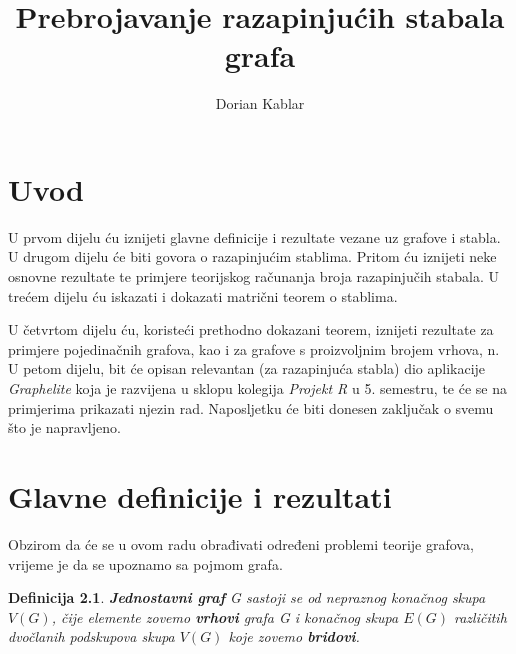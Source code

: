 \documentclass[times, utf8, zavrsni]{fer}
\newtheorem{definition}{Definicija}[section]
\begin{document}

\title{Prebrojavanje razapinjućih stabala grafa}

\author{Dorian Kablar}

\maketitle



\tableofcontents

\chapter{Uvod}
U prvom dijelu ću iznijeti glavne definicije i rezultate vezane uz grafove i stabla. U drugom dijelu će biti govora o razapinjućim stablima. Pritom ću iznijeti neke osnovne rezultate te primjere teorijskog računanja broja razapinjučih stabala. 
U trećem dijelu ću iskazati i dokazati matrični teorem o stablima. 

U četvrtom dijelu ću, koristeći prethodno dokazani teorem, iznijeti rezultate za primjere pojedinačnih grafova, kao i za grafove s proizvoljnim brojem vrhova, n. U petom dijelu, bit će opisan relevantan (za razapinjuća stabla) dio aplikacije \textit{Graphelite} koja je razvijena u sklopu kolegija \textit{Projekt R} u 5. semestru, te će se na primjerima prikazati njezin rad. Naposljetku će biti donesen zaključak o svemu što je napravljeno.

\chapter{Glavne definicije i rezultati}

Obzirom da će se u ovom radu obrađivati određeni problemi teorije grafova, vrijeme je da se upoznamo sa pojmom grafa.

\begin{definition}
	\textbf{Jednostavni graf} G sastoji se od nepraznog konačnog skupa $V(G)$, čije elemente zovemo \textbf{vrhovi} grafa G i konačnog skupa $E(G)$ različitih dvočlanih podskupova skupa $V(G)$ koje zovemo \textbf{bridovi}.
\end{definition}
\end{document}
